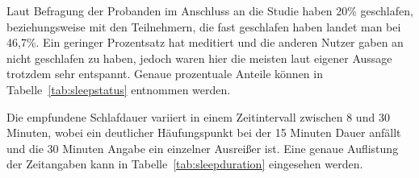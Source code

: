 Laut Befragung der Probanden im Anschluss an die Studie haben 20\% geschlafen, beziehungsweise mit den Teilnehmern, die fast geschlafen haben landet man bei 46,7\%. Ein geringer Prozentsatz hat meditiert und die anderen Nutzer gaben an nicht geschlafen zu haben, jedoch waren hier die meisten laut eigener Aussage trotzdem sehr entspannt. Genaue prozentuale Anteile können in Tabelle~\ref{tab:sleepstatus} entnommen werden. 

Die empfundene Schlafdauer variiert in einem Zeitintervall zwischen 8 und 30 Minuten, wobei ein deutlicher Häufungspunkt bei der 15 Minuten Dauer anfällt und die 30 Minuten Angabe ein einzelner Ausreißer ist. Eine genaue Auflistung der Zeitangaben kann in Tabelle~\ref{tab:sleepduration} eingesehen werden.
